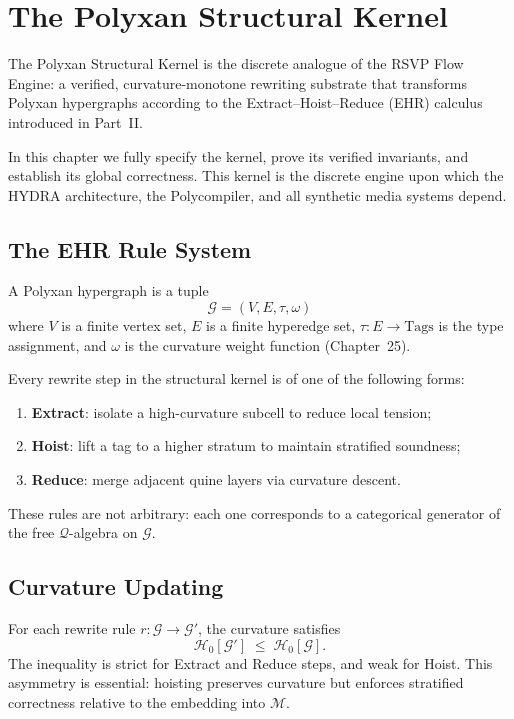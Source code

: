 \chapter{The Polyxan Structural Kernel}
\label{ch:75}

The Polyxan Structural Kernel is the discrete analogue of the RSVP Flow
Engine: a verified, curvature-monotone rewriting substrate that transforms
Polyxan hypergraphs according to the Extract--Hoist--Reduce (EHR) calculus
introduced in Part~II.

In this chapter we fully specify the kernel, prove its verified invariants,
and establish its global correctness.  
This kernel is the discrete engine upon which the HYDRA architecture,
the Polycompiler, and all synthetic media systems depend.

\section{The EHR Rule System}

A Polyxan hypergraph is a tuple
\[
\mathcal{G} = (V,E,\tau,\omega)
\]
where $V$ is a finite vertex set, $E$ is a finite hyperedge set,
$\tau:E\to\mathrm{Tags}$ is the type assignment,
and $\omega$ is the curvature weight function (Chapter~25).

Every rewrite step in the structural kernel is of one of the following forms:

\begin{enumerate}
\item \textbf{Extract}: isolate a high-curvature subcell to reduce local tension;
\item \textbf{Hoist}: lift a tag to a higher stratum to maintain stratified soundness;
\item \textbf{Reduce}: merge adjacent quine layers via curvature descent.
\end{enumerate}

These rules are not arbitrary: each one corresponds to a categorical generator
of the free $\mathcal{Q}$-algebra on $\mathcal{G}$.

\section{Curvature Updating}

For each rewrite rule $r:\mathcal{G}\to\mathcal{G}'$, the curvature satisfies
\[
\mathcal{H}_0[\mathcal{G}'] \;\le\; \mathcal{H}_0[\mathcal{G}].
\]
The inequality is strict for Extract and Reduce steps, and weak for Hoist.
This asymmetry is essential: hoisting preserves curvature but enforces
stratified correctness relative to the embedding into $\mathcal{M}$.

